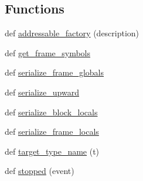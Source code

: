 \subsection*{Functions}
\begin{DoxyCompactItemize}
\item 
def \hyperlink{namespacememoryoracle_1_1instance_ac651a8635b1ae2ee7e788bf9adb17a0b}{addressable\+\_\+factory} (description)
\item 
def \hyperlink{namespacememoryoracle_1_1instance_a31e7e3135691ee03e847163a5b1e3950}{get\+\_\+frame\+\_\+symbols}
\item 
def \hyperlink{namespacememoryoracle_1_1instance_a2b902e26969fe19c09ad673fd8f1bbb5}{serialize\+\_\+frame\+\_\+globals}
\item 
def \hyperlink{namespacememoryoracle_1_1instance_a90a3c2f070ac8af0b41e6947d2b71a8a}{serialize\+\_\+upward}
\item 
def \hyperlink{namespacememoryoracle_1_1instance_a78622e017f520b55ef2a05cffded052b}{serialize\+\_\+block\+\_\+locals}
\item 
def \hyperlink{namespacememoryoracle_1_1instance_a958b2f6afa09c327a9e48bbe2fc7f125}{serialize\+\_\+frame\+\_\+locals}
\item 
def \hyperlink{namespacememoryoracle_1_1instance_a4b8eb263a612b709be51201fc0fa7b6c}{target\+\_\+type\+\_\+name} (t)
\item 
def \hyperlink{namespacememoryoracle_1_1instance_a05aa9c531f257d44ef9ac5f60f4e3859}{stopped} (event)
\end{DoxyCompactItemize}
